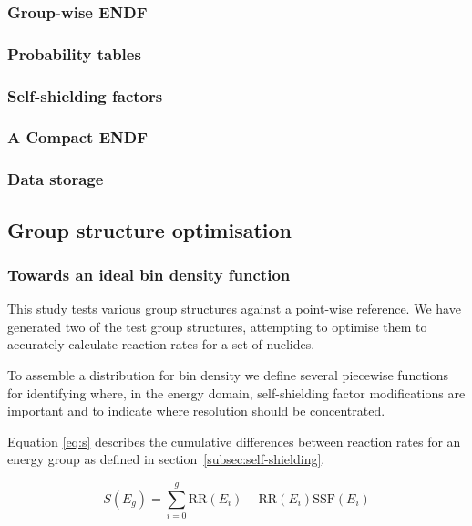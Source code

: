 \subsubsection{Group-wise ENDF}

\subsubsection{Probability tables}

\subsubsection{Self-shielding factors}

\subsubsection{A Compact ENDF}

\subsubsection{Data storage }

\subsection{Group structure optimisation}
\label{subsec:opt}

\subsubsection{Towards an ideal bin density function}
This study tests various group structures against a point-wise reference. We have generated two of the test group structures, attempting to optimise them to accurately calculate reaction rates for a set of nuclides.

To assemble a distribution for bin density we define several piecewise functions for identifying where, in the energy domain, self-shielding factor modifications are important and to indicate where resolution should be concentrated. 

Equation \ref{eq:s} describes the cumulative differences between reaction rates for an energy group as defined in section~\ref{subsec:self-shielding}. 

\begin{equation}
\label{eq:s}
S(E_{g}) = \sum_{i=0}^{g} \mathrm{RR}(E_{i}) - \mathrm{RR}(E_{i})\mathrm{SSF}(E_{i})
\end{equation}

